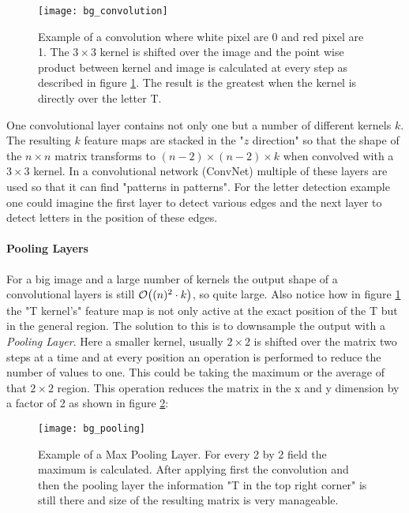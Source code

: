 \begin{figure}[H]
    \centering
    \texttt{[image: bg\_convolution]}
    \caption{Example of a convolution where white pixel are 0 and red pixel are 1. The $3 \times 3$ kernel is shifted over the image and the point wise product between kernel and image is calculated at every step as described in figure \ref{fig:bg:convolution}. The result is the greatest when the kernel is directly over the letter T.}
    \label{fig:bg:convolution}
\end{figure}

One convolutional layer contains not only one but a number of different kernels $k$. The resulting $k$ feature maps are stacked in the "$z$ direction" so that the shape of the $n \times n$ matrix transforms to $(n-2) \times (n-2) \times k$ when convolved with a $3 \times 3$ kernel. In a convolutional network (ConvNet) multiple of these layers are used so that it can find "patterns in patterns". For the letter detection example one could imagine the first layer to detect various edges and the next layer to detect letters in the position of these edges.

\paragraph{Pooling Layers}
For a big image and a large number of kernels the output shape of a convolutional layers is still $\order{(n)^2 \cdot k}$, so quite large. Also notice how in figure \ref{fig:bg:convolution} the "T kernel's" feature map is not only active at the exact position of the T but in the general region. The solution to this is to downsample the output with a \textit{Pooling Layer}. Here a smaller kernel, usually $2 \times 2$ is shifted over the matrix two steps at a time and at every position an operation is performed to reduce the number of values to one. This could be taking the maximum or the average of that $2 \times 2$ region. This operation reduces the matrix in the x and y dimension by a factor of 2 as shown in figure \ref{fig:bg:pooling}:

\begin{figure}[H]
    \centering
    \texttt{[image: bg\_pooling]}
    \caption{Example of a Max Pooling Layer. For every 2 by 2 field the maximum is calculated. After applying first the convolution and then the pooling layer the information "T in the top right corner" is still there and size of the resulting matrix is very manageable.}
    \label{fig:bg:pooling}
\end{figure}
\vspace{1cm}

